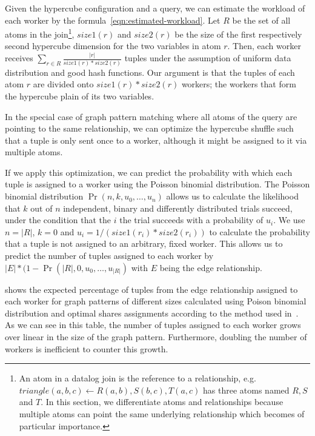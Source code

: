 Given the hypercube configuration and a query, we can estimate the workload of each worker by the formula~\ref{eqn:estimated-workload}.
Let $R$ be the set of all atoms in the join\footnote{An atom in a datalog join is the reference to a relationship,
e.g. $triangle(a, b, c) \leftarrow R(a, b), S(b, c), T(a, c)$ has three atoms named $R, S$ and $T$.
In this section, we differentiate atoms and relationships because multiple atoms can point the same underlying relationship which
becomes of particular importance.},
$size1(r)$ and $size2(r)$ be the size of the first respectively second hypercube dimension for the two variables in atom $r$.
Then, each worker receives $\sum_{r \in R}{ \frac{|r|}{size1(r) * size2(r)}}$ tuples under the assumption of uniform data distribution
and good hash functions.
Our argument is that the tuples of each atom $r$ are divided onto $size1(r) * size2(r)$ workers;
the workers that form the hypercube plain of its two variables.

In the special case of graph pattern matching where all atoms of the query are pointing to the same relationship,
we can optimize the hypercube shuffle such that a tuple is only sent once to a worker, although it might be assigned to it via
multiple atoms.

If we apply this optimization, we can predict the probability with which each tuple is assigned to a worker using the Poisson binomial
distribution.
The Poisson binomial distribution $\Pr(n, k, u_0, \dots, u_n)$ allows us to calculate the likelihood that $k$ out of $n$ independent,
binary and differently distributed trials succeed, under the condition that the $i$ the trial succeeds with a probability of $u_i$.
We use $n = |R|$, $k = 0$ and $u_i=1/(size1(r_i) * size2(r_i))$ to calculate the probability that a tuple is not assigned to an
arbitrary, fixed worker.
This allows us to predict the number of tuples assigned to each worker by $|E| * (1 - \Pr(|R|, 0, u_0, \dots, u_{|R|})$ with $E$ being
the edge relationship.

 shows the expected percentage of tuples from the edge relationship assigned to each worker for graph
patterns of different sizes calculated using Poison binomial distribution and optimal shares assignments according to the method used
in~\cite{myria-detailed}.
As we can see in this table, the number of tuples assigned to each worker grows over linear in the size of the graph pattern.
Furthermore, doubling the number of workers is inefficient to counter this growth.

